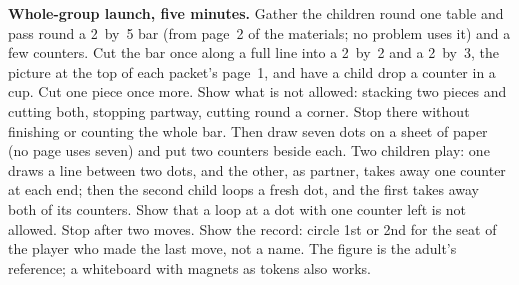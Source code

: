 \documentclass[11pt]{article}
\begin{document}
\textbf{Whole-group launch, five minutes.} Gather the children round one table and pass round a 2~by~5 bar (from page~2 of the materials; no problem uses it) and a few counters. Cut the bar once along a full line into a 2~by~2 and a 2~by~3, the picture at the top of each packet's page~1, and have a child drop a counter in a cup. Cut one piece once more. Show what is not allowed: stacking two pieces and cutting both, stopping partway, cutting round a corner. Stop there without finishing or counting the whole bar. Then draw seven dots on a sheet of paper (no page uses seven) and put two counters beside each. Two children play: one draws a line between two dots, and the other, as partner, takes away one counter at each end; then the second child loops a fresh dot, and the first takes away both of its counters. Show that a loop at a dot with one counter left is not allowed. Stop after two moves. Show the record: circle 1st or 2nd for the seat of the player who made the last move, not a name. The figure is the adult's reference; a whiteboard with magnets as tokens also works.
\end{document}

